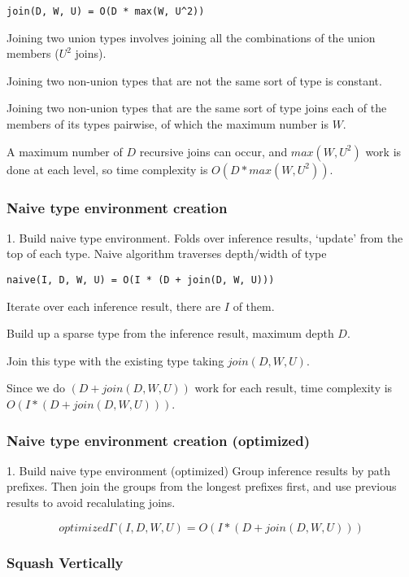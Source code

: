 \begin{verbatim}
join(D, W, U) = O(D * max(W, U^2))
\end{verbatim}

Joining two union types involves joining all the combinations of the union members ($U^2$ joins).

Joining two non-union types that are not the same sort of type is constant.

Joining two non-union types that are the same sort of type joins
each of the members of its types pairwise, of which the maximum number is $W$.

A maximum number of $D$ recursive joins can occur, and $max(W, U^2)$ work is done
at each level, so time complexity is $O(D * max(W, U^2))$.

\subsubsection{Naive type environment creation}

1. Build naive type environment.
   Folds over inference results, `update' from the top of each type.
   Naive algorithm traverses depth/width of type 

\begin{verbatim}
naive(I, D, W, U) = O(I * (D + join(D, W, U)))
\end{verbatim}

Iterate over each inference result, there are $I$ of them.

Build up a sparse type from the inference result, maximum depth $D$.

Join this type with the existing type taking $join(D, W, U)$.

Since we do $(D + join(D, W, U))$ work for each result, time complexity
is $O(I * (D + join(D, W, U)))$.

\subsubsection{Naive type environment creation (optimized)}

1. Build naive type environment (optimized)
  Group inference results by path prefixes. Then join the groups
  from the longest prefixes first, and use previous results to avoid
  recalulating joins.

\[
optimized\Gamma(I, D, W, U) = O(I * (D + join(D, W, U)))
\]

\subsubsection{Squash Vertically}

